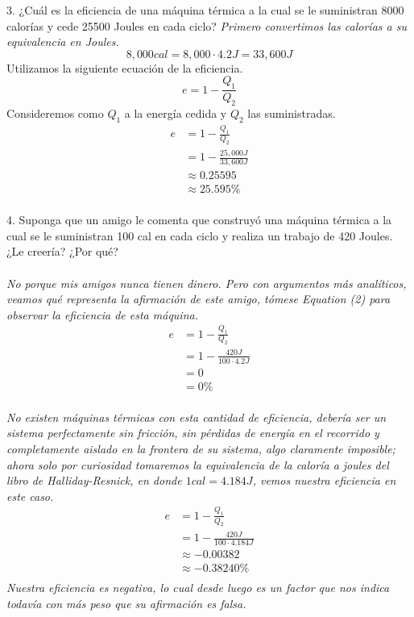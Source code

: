 \documentclass{article}
\begin{document}
3. ¿Cuál es la eficiencia de una máquina térmica a la cual se le suministran 8000 calorías y cede 25500 Joules en cada ciclo?
\textit{Primero convertimos las calorías a su equivalencia en Joules.}
\[ 8,000cal = 8,000 \cdot 4.2 J = 33,600J \]
Utilizamos la siguiente ecuación de la eficiencia.
\begin{equation}
    e = 1 - \frac{Q_1}{Q_2}
\end{equation}
Consideremos como $Q_1$ a la energía cedida y $Q_2$ las suministradas.
\begin{align*}
    e &= 1 - \frac{Q_1}{Q_2} \\
    &= 1 - \frac{25,000J}{33,600J} \\
    &\approx 0.25595 \\
    &\approx 25.595 \% \\
\end{align*}

4. Suponga que un amigo le comenta que construyó una máquina térmica a la cual se le suministran 100 cal en cada ciclo y realiza un trabajo de 420 Joules. ¿Le creería? ¿Por qué?\\\\
\textit{No porque mis amigos nunca tienen dinero. Pero con argumentos más analíticos, veamos qué representa la afirmación de este amigo, tómese Equation (2) para observar la eficiencia de esta máquina.}
\begin{align*}
    e &= 1 - \frac{Q_1}{Q_2} \\
    &= 1 - \frac{420J}{100\cdot4.2J} \\
    &= 0 \\
    &= 0 \% \\
\end{align*}

\textit{No existen máquinas térmicas con esta cantidad de eficiencia, debería ser un sistema perfectamente sin fricción, sin pérdidas de energía en el recorrido y completamente aislado en la frontera de su sistema, algo claramente imposible; ahora solo por curiosidad tomaremos la equivalencia de la caloría a joules del libro de Halliday-Resnick, en donde $1cal=4.184J$, vemos nuestra eficiencia en este caso.}
\begin{align*}
    e &= 1 - \frac{Q_1}{Q_2} \\
    &= 1 - \frac{420J}{100\cdot4.184J} \\
    &\approx -0.00382 \\
    &\approx -0.38240 \% \\
\end{align*}
\textit{Nuestra eficiencia es negativa, lo cual desde luego es un factor que nos indica todavía con más peso que su afirmación es falsa.} \\
\end{document}
